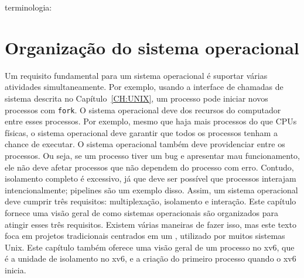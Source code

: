  terminologia: 
\chapter{Organização do sistema operacional} \label{CH:FIRST}
Um requisito fundamental para um sistema operacional é suportar várias atividades simultaneamente. Por exemplo, usando a interface de chamadas de sistema descrita no Capítulo~\ref{CH:UNIX}, um processo pode iniciar novos processos com \lstinline{fork}. O sistema operacional deve  dos recursos do computador entre esses processos. Por exemplo, mesmo que haja mais processos do que CPUs físicas, o sistema operacional deve garantir que todos os processos tenham a chance de executar. O sistema operacional também deve providenciar  entre os processos. Ou seja, se um processo tiver um bug e apresentar mau funcionamento, ele não deve afetar processos que não dependem do processo com erro. Contudo, isolamento completo é excessivo, já que deve ser possível que processos interajam intencionalmente; pipelines são um exemplo disso. Assim, um sistema operacional deve cumprir três requisitos: multiplexação, isolamento e interação.
Este capítulo fornece uma visão geral de como sistemas operacionais são organizados para atingir esses três requisitos. Existem várias maneiras de fazer isso, mas este texto foca em projetos tradicionais centrados em um , utilizado por muitos sistemas Unix. Este capítulo também oferece uma visão geral de um processo no xv6, que é a unidade de isolamento no xv6, e a criação do primeiro processo quando o xv6 inicia.
